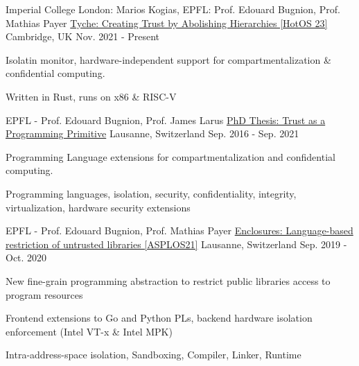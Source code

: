 \begin{cventries}

\cventry
{Imperial College London: Marios Kogias, EPFL: Prof. Edouard Bugnion, Prof. Mathias Payer}
  {\href{https://aghosn.github.io/assets/pdf/tyche_aghosn.pdf}{Tyche: Creating Trust by Abolishing Hierarchies [HotOS 23]}}
{Cambridge, UK}
{Nov. 2021 - Present}
{ %
	\begin{cvitems}
  \item{Isolatin monitor, hardware-independent support for compartmentalization \& confidential computing.}
  \item{Written in Rust, runs on x86 \& RISC-V}
	\end{cvitems}
}



\cventry
{EPFL - Prof. Edouard Bugnion, Prof. James Larus}
  {\href{https://infoscience.epfl.ch/record/289120}{PhD Thesis: Trust as a Programming Primitive}}
{Lausanne, Switzerland}
{Sep. 2016  - Sep. 2021}
{
	\begin{cvitems}
  \item{Programming Language extensions for compartmentalization and confidential computing.}
  \item{Programming languages, isolation, security, confidentiality, integrity, virtualization, hardware security extensions}
	\end{cvitems}
}


\cventry
{EPFL - Prof. Edouard Bugnion, Prof. Mathias Payer}
  {\href{https://aghosn.github.io/assets/pdf/enclosure_aghosn.pdf}{Enclosures: Language-based restriction of untrusted libraries [ASPLOS21]}}
{Lausanne, Switzerland}
{Sep. 2019  - Oct. 2020}
{
	\begin{cvitems}
  \item{New fine-grain programming abstraction to restrict public libraries access to program resources}
  \item{Frontend extensions to Go and Python PLs, backend hardware isolation enforcement (Intel VT-x \& Intel MPK)}
  \item{Intra-address-space isolation, Sandboxing, Compiler, Linker, Runtime}
	\end{cvitems}
}


\end{cventries}

